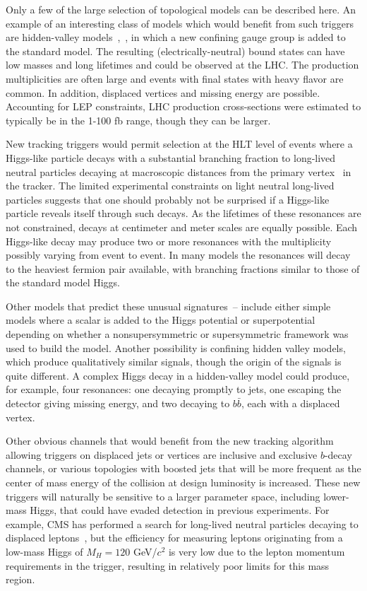 \documentclass{JINST}
\begin{document}
Only a few of the large selection of topological models can be described here. An example of an
interesting class of models which would benefit from such triggers are hidden-valley models~\cite{bib:hiddenvalley},~\cite{Han:2007ae},
in which a new confining gauge group is added to the standard model. The resulting (electrically-neutral) bound states can have
 low masses and long lifetimes and could be observed at the LHC. The production multiplicities are often large and events with final states with heavy flavor are
common. In addition, displaced vertices and missing energy are possible. Accounting for LEP constraints, LHC production 
cross-sections were estimated to typically be in the 1-100 fb range, though they can be larger.

New tracking triggers would permit selection at the HLT level of events where a Higgs-like particle decays with a substantial branching 
fraction to long-lived neutral particles decaying
at macroscopic distances from the primary vertex~\cite{bib:hiddenvalley} in the tracker. The limited experimental constraints on light neutral long-lived particles
suggests that one should probably not be surprised if a Higgs-like particle reveals itself  through such decays. As the lifetimes of these resonances 
are not constrained, decays at centimeter and meter scales are equally possible. Each Higgs-like decay may produce two or more resonances 
with the multiplicity possibly varying from event to event. In many models the resonances will decay to the heaviest fermion 
pair available, with branching fractions similar to those of the standard model Higgs.

Other models that predict these unusual signatures~\cite{bib:hiddenvalley}--\cite{Strassler:2006ri} include either simple models where a scalar is added to the Higgs potential or superpotential depending on whether a nonsupersymmetric
or supersymmetric framework was used to build the model. Another possibility is confining hidden valley models, which produce qualitatively similar signals, though the origin of the signals is 
quite different.  A complex Higgs decay in a hidden-valley model could produce, for example, four resonances: one decaying promptly to jets,
 one escaping the detector giving missing energy, and two decaying to $b\bar{b}$, each with a displaced vertex.  

Other obvious channels that would benefit from the new tracking algorithm allowing triggers on displaced jets
or vertices are inclusive and exclusive $b$-decay channels, or various topologies with boosted jets that will
be more frequent as the center of mass energy of the collision at design luminosity is increased. These new
triggers will naturally be sensitive to a larger parameter space, including lower-mass Higgs, that could have
evaded detection in previous experiments. For example, CMS has performed a search for long-lived neutral
particles decaying to displaced leptons~\cite{Chatrchyan:2012jna}, but the efficiency for measuring leptons
originating from a low-mass Higgs of $M_H = 120$ GeV/$c^2$ is very low due to the lepton momentum requirements
in the trigger, resulting in relatively poor limits for this mass region.
\end{document}
